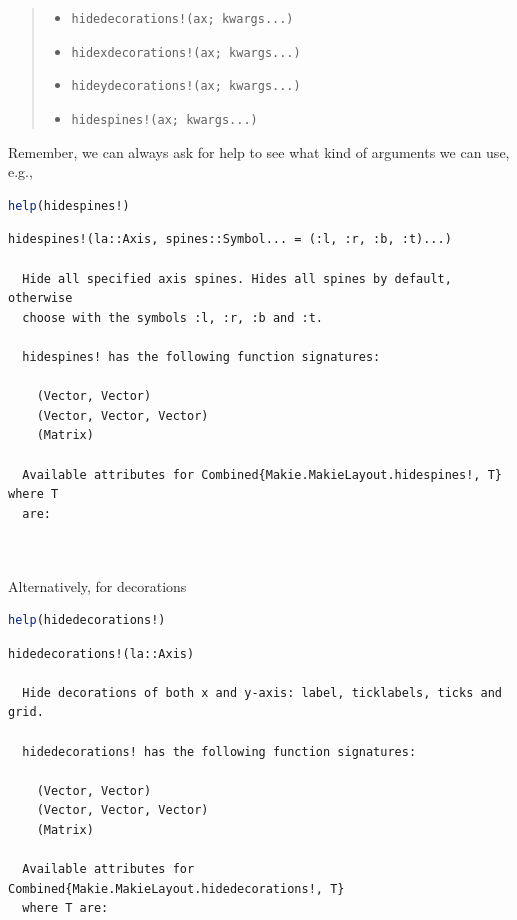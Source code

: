\documentclass[
  notoc %
]{tufte-book}
\providecommand{\tightlist}{%
  \setlength{\itemsep}{0pt}\setlength{\parskip}{0pt}
}
\newcommand{\passthrough}[1]{#1}
\begin{document}
\begin{quote}
\begin{itemize}
\tightlist
\item
  \passthrough{\lstinline"hidedecorations!(ax; kwargs...)"}
\item
  \passthrough{\lstinline"hidexdecorations!(ax; kwargs...)"}
\item
  \passthrough{\lstinline"hideydecorations!(ax; kwargs...)"}
\item
  \passthrough{\lstinline"hidespines!(ax; kwargs...)"}
\end{itemize}
\end{quote}

Remember, we can always ask for help to see what kind of arguments we
can use, e.g.,

\begin{lstlisting}[language=Julia]
help(hidespines!)
\end{lstlisting}

\begin{lstlisting}[language=Output]
  hidespines!(la::Axis, spines::Symbol... = (:l, :r, :b, :t)...)

  Hide all specified axis spines. Hides all spines by default, otherwise
  choose with the symbols :l, :r, :b and :t.

  hidespines! has the following function signatures:

    (Vector, Vector)
    (Vector, Vector, Vector)
    (Matrix)

  Available attributes for Combined{Makie.MakieLayout.hidespines!, T} where T
  are:

  
\end{lstlisting}

Alternatively, for decorations

\begin{lstlisting}[language=Julia]
help(hidedecorations!)
\end{lstlisting}

\begin{lstlisting}[language=Output]
  hidedecorations!(la::Axis)

  Hide decorations of both x and y-axis: label, ticklabels, ticks and grid.

  hidedecorations! has the following function signatures:

    (Vector, Vector)
    (Vector, Vector, Vector)
    (Matrix)

  Available attributes for Combined{Makie.MakieLayout.hidedecorations!, T}
  where T are:

  
\end{lstlisting}
\end{document}
